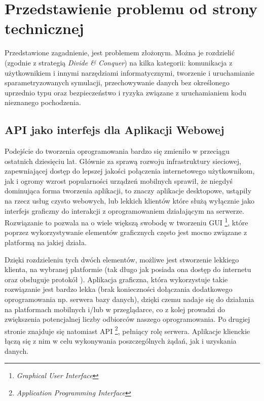 \chapter{Przedstawienie problemu od strony technicznej}
\label{cha:przedstawienieProblemuOdStronyTechnicznej}

\par Przedstawione zagadnienie, jest problemem złożonym. Można je rozdzielić (zgodnie z strategią \emph{Divide \& Conquer}) na kilka kategorii: komunikacja z użytkownikiem i innymi narzędziami informatycznymi, tworzenie i uruchamianie sparametryzowanych symulacji, przechowywanie danych bez określonego uprzednio typu oraz bezpieczeństwo i ryzyka związane z uruchamianiem kodu nieznanego pochodzenia.

\section{API jako interfejs dla Aplikacji Webowej}

\par Podejście do tworzenia oprogramowania bardzo się zmieniło w przeciągu ostatnich dziesięciu lat. Głównie za sprawą rozwoju infrastruktury sieciowej, zapewniającej dostęp do lepszej jakości połączenia internetowego użytkownikom, jak i ogromy wzrost popularności urządzeń mobilnych sprawił, że niegdyś dominująca forma tworzenia aplikacji, to znaczy aplikacje desktopowe, ustąpiły na rzecz usług czysto webowych, lub lekkich klientów które służą wyłącznie jako interfejs graficzny do interakcji z oprogramowaniem działającym na serwerze.
Rozwiązanie to pozwala na o wiele większą swobodę w tworzeniu GUI \footnote{\emph{Graphical User Interface}}, które poprzez wykorzystywanie elementów graficznych często jest mocno związane z platformą na jakiej działa.

\par Dzięki rozdzieleniu tych dwóch elementów, możliwe jest stworzenie lekkiego klienta, na wybranej platformie (tak długo jak posiada ona dostęp do internetu oraz obsługuje protokół \texttt{\https{}}). Aplikacja graficzna, która wykorzystuje takie rozwiązanie jest bardzo lekka (brak konieczności dołączania dodatkowego oprogramowania np. serwera bazy danych), dzięki czemu nadaje się do działania na platformach mobilnych i/lub w przeglądarce, co z kolej prowadzi do zwiększenia potencjalnej liczby odbiorców naszego oprogramowania. Po drugiej stronie znajduje się natomiast API \footnote{\emph{Application Programming Interface}}, pełniący rolę serwera. Aplikacje klienckie łączą się z nim w celu wykonywania poszczególnych żądań, jak i uzyskania danych.

